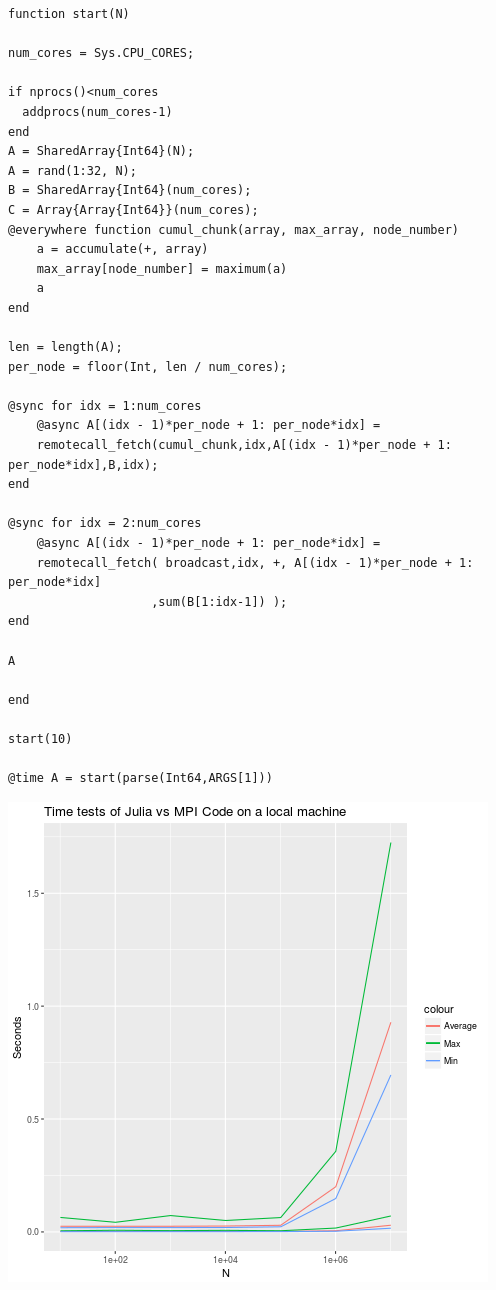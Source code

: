 \documentclass[10pt]{article}
\begin{document}
\begin{lstlisting}
function start(N)

num_cores = Sys.CPU_CORES;

if nprocs()<num_cores
  addprocs(num_cores-1)
end
A = SharedArray{Int64}(N);
A = rand(1:32, N);
B = SharedArray{Int64}(num_cores);
C = Array{Array{Int64}}(num_cores);
@everywhere function cumul_chunk(array, max_array, node_number)
    a = accumulate(+, array)
    max_array[node_number] = maximum(a)
    a
end

len = length(A);
per_node = floor(Int, len / num_cores);

@sync for idx = 1:num_cores
    @async A[(idx - 1)*per_node + 1: per_node*idx] = 
    remotecall_fetch(cumul_chunk,idx,A[(idx - 1)*per_node + 1: per_node*idx],B,idx);	
end

@sync for idx = 2:num_cores
    @async A[(idx - 1)*per_node + 1: per_node*idx] = 
    remotecall_fetch( broadcast,idx, +, A[(idx - 1)*per_node + 1: per_node*idx] 
    				,sum(B[1:idx-1]) );	
end

A

end

start(10)

@time A = start(parse(Int64,ARGS[1]))
\end{lstlisting}

\includegraphics[width=\textwidth]{./plot.png}
\end{document}
